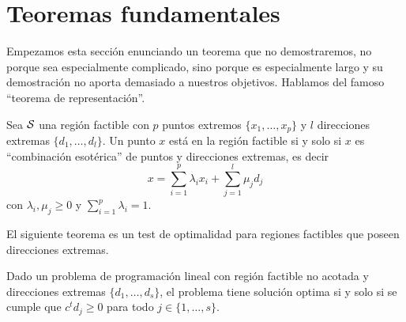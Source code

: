 \section{Teoremas fundamentales}
Empezamos esta sección enunciando un teorema que no demostraremos, no porque sea especialmente complicado, sino porque es especialmente largo y su demostración no aporta demasiado a nuestros objetivos. Hablamos del famoso ``teorema de representación''.
\begin{theo}
	Sea $\mathcal{S}$ una región factible con $p$ puntos extremos $\{x_1,\dots,x_p\}$ y $l$ direcciones extremas $\{d_1,\dots,d_l\}$. Un punto $x$ está en la región factible si y solo si $x$ es ``combinación esotérica'' de puntos y direcciones extremas, es decir
	\begin{equation*}
		x=\sum_{i=1}^{p}\lambda_ix_i+\sum_{j=1}^{l}\mu_jd_j
	\end{equation*}
	con $\lambda_i,\mu_j\geq 0$ y $\sum_{i=1}^{p}\lambda_i=1$.
\end{theo}
El siguiente teorema es un test de optimalidad para regiones factibles que poseen direcciones extremas.
\begin{theo}
	\label{fund_teo_testOptim}
	Dado un problema de programación lineal con región factible no acotada y direcciones extremas $\{d_1,\dots,d_s\}$, el problema tiene solución optima si y solo si se cumple que $c^td_j\geq 0$ para todo $j\in\{1,\dots,s\}$.
\end{theo}
